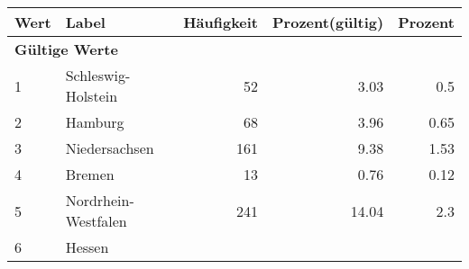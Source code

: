      \begin{longtable}{lXrrr}
     \toprule
     \textbf{Wert} & \textbf{Label} & \textbf{Häufigkeit} & \textbf{Prozent(gültig)} & \textbf{Prozent} \\
     \endhead
     \midrule
     \multicolumn{5}{l}{\textbf{Gültige Werte}}\\

     1 &
     \multicolumn{1}{X}{ Schleswig-Holstein   } &


       \num{52} &
       \num[round-mode=places,round-precision=2]{3.03} &
         \num[round-mode=places,round-precision=2]{0.5} \\

     2 &
     \multicolumn{1}{X}{ Hamburg   } &


       \num{68} &
       \num[round-mode=places,round-precision=2]{3.96} &
         \num[round-mode=places,round-precision=2]{0.65} \\

     3 &
     \multicolumn{1}{X}{ Niedersachsen   } &


       \num{161} &
       \num[round-mode=places,round-precision=2]{9.38} &
         \num[round-mode=places,round-precision=2]{1.53} \\

     4 &
     \multicolumn{1}{X}{ Bremen   } &


       \num{13} &
       \num[round-mode=places,round-precision=2]{0.76} &
         \num[round-mode=places,round-precision=2]{0.12} \\

     5 &
     \multicolumn{1}{X}{ Nordrhein-Westfalen   } &


       \num{241} &
       \num[round-mode=places,round-precision=2]{14.04} &
         \num[round-mode=places,round-precision=2]{2.3} \\

     6 &
     \multicolumn{1}{X}{ Hessen   } &



\end{longtable}
